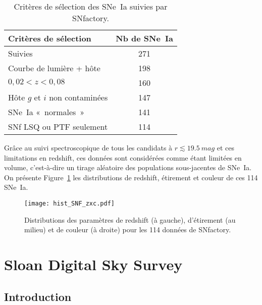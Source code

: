 \documentclass[../main/main.tex]{subfiles}
\begin{document}
\begin{table}[ht]
    \centering
    \caption{Critères de sélection des SNe~Ia suivies par SNfactory.}
    \label{tab:snfcuts}
    \begin{tabular}{lc}
        \toprule
        Critères de sélection           & Nb de SNe~Ia \\
        \midrule
        Suivies                         & 271 \\
        Courbe de lumière + hôte        & 198 \\
        $0,02 < z < 0,08$               & 160 \\
        Hôte $g$ et $i$ non contaminées & 147 \\
        SNe~Ia «~normales~»             & 141 \\
        SNf LSQ ou PTF seulement        & 114 \\
        \bottomrule
    \end{tabular}
\end{table}

Grâce au suivi spectroscopique de tous les candidats à $r \lesssim
\SI{19,5}{mag}$ et ces limitations en redshift, ces données sont considérées
comme étant limitées en volume, c'est-à-dire un tirage aléatoire des populations
sous-jacentes de SNe~Ia. On présente Figure~\ref{fig:snfhist} les distributions
de redshift, étirement et couleur de ces 114 SNe~Ia.

\begin{figure}[ht]
    \centering
    \texttt{[image: hist\_SNF\_zxc.pdf]}
    \caption[Distributions des paramètres de redshift, étirement et couleur de
    SNf]{Distributions des paramètres de redshift (à gauche), d'étirement (au
    milieu) et de couleur (à droite) pour les 114 données de SNfactory.}
    \label{fig:snfhist}
\end{figure}

\section{Sloan Digital Sky Survey}\label{sec:sdss}
\subsection{Introduction}\label{ssec:sdssintro}
\end{document}

